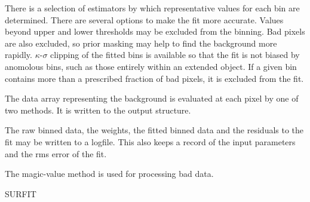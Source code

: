 {\begin{manroutinedescription}
  There is a selection of estimators by which representative
  values for each bin are determined. There are several options to
  make the fit more accurate.  Values beyond upper and lower
  thresholds may be excluded from the binning.  Bad pixels are also
  excluded, so prior masking may help to find the background more
  rapidly.  {$\kappa$}-{$\sigma$} clipping of the fitted bins is available
  so that the fit is not biased by anomolous bins, such as those
  entirely within an extended object.  If a given bin contains more
  than a prescribed fraction of bad pixels, it is excluded from the
  fit.

  The data array representing the background is evaluated at each
  pixel by one of two methods.  It is written to the output {}
  structure.

  The raw binned data, the weights, the fitted binned data and the
  residuals to the fit may be written to a logfile.  This also
  keeps a record of the input parameters and the rms error of the
  fit.

  The magic-value method is used for processing bad data.

  SURFIT


\end{manroutinedescription}}
